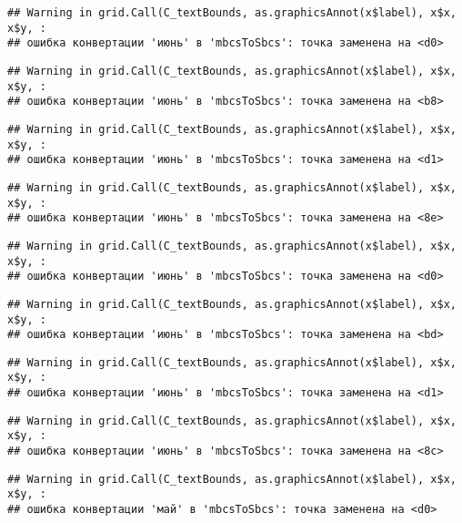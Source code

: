 \documentclass[
]{article}
\begin{document}
\begin{verbatim}
## Warning in grid.Call(C_textBounds, as.graphicsAnnot(x$label), x$x, x$y, :
## ошибка конвертации 'июнь' в 'mbcsToSbcs': точка заменена на <d0>
\end{verbatim}

\begin{verbatim}
## Warning in grid.Call(C_textBounds, as.graphicsAnnot(x$label), x$x, x$y, :
## ошибка конвертации 'июнь' в 'mbcsToSbcs': точка заменена на <b8>
\end{verbatim}

\begin{verbatim}
## Warning in grid.Call(C_textBounds, as.graphicsAnnot(x$label), x$x, x$y, :
## ошибка конвертации 'июнь' в 'mbcsToSbcs': точка заменена на <d1>
\end{verbatim}

\begin{verbatim}
## Warning in grid.Call(C_textBounds, as.graphicsAnnot(x$label), x$x, x$y, :
## ошибка конвертации 'июнь' в 'mbcsToSbcs': точка заменена на <8e>
\end{verbatim}

\begin{verbatim}
## Warning in grid.Call(C_textBounds, as.graphicsAnnot(x$label), x$x, x$y, :
## ошибка конвертации 'июнь' в 'mbcsToSbcs': точка заменена на <d0>
\end{verbatim}

\begin{verbatim}
## Warning in grid.Call(C_textBounds, as.graphicsAnnot(x$label), x$x, x$y, :
## ошибка конвертации 'июнь' в 'mbcsToSbcs': точка заменена на <bd>
\end{verbatim}

\begin{verbatim}
## Warning in grid.Call(C_textBounds, as.graphicsAnnot(x$label), x$x, x$y, :
## ошибка конвертации 'июнь' в 'mbcsToSbcs': точка заменена на <d1>
\end{verbatim}

\begin{verbatim}
## Warning in grid.Call(C_textBounds, as.graphicsAnnot(x$label), x$x, x$y, :
## ошибка конвертации 'июнь' в 'mbcsToSbcs': точка заменена на <8c>
\end{verbatim}

\begin{verbatim}
## Warning in grid.Call(C_textBounds, as.graphicsAnnot(x$label), x$x, x$y, :
## ошибка конвертации 'май' в 'mbcsToSbcs': точка заменена на <d0>
\end{verbatim}
\end{document}
